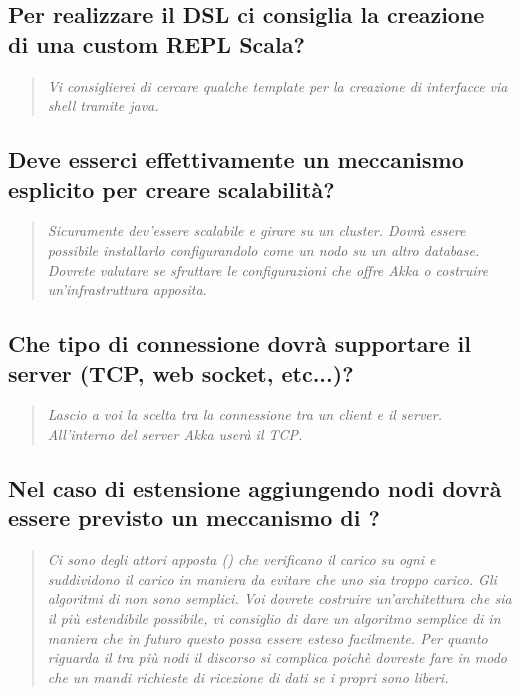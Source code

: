 \documentclass{scalatekids-article}
\begin{document}
\subsection{Per realizzare il DSL ci consiglia la creazione di una custom REPL Scala?}
\begin{quote}
  \textit{Vi consiglierei di cercare qualche template per la creazione di interfacce via shell tramite java.\\}
\end{quote}
\subsection{Deve esserci effettivamente un meccanismo esplicito per creare scalabilità?}
\begin{quote}
  \textit{Sicuramente dev'essere scalabile e girare su un cluster. Dovrà essere possibile installarlo configurandolo come un nodo su un altro database. Dovrete valutare se sfruttare le configurazioni che 
  offre Akka o costruire un'infrastruttura apposita.\\}
\end{quote}
\subsection{Che tipo di connessione dovrà supportare il server (TCP, web socket, etc...)?}
\begin{quote}
  \textit{Lascio a voi la scelta tra la connessione tra un client e il server. All'interno del server Akka userà il TCP.\\}
\end{quote}
\subsection{Nel caso di estensione aggiungendo nodi dovrà essere previsto un meccanismo di ?}
\begin{quote}
  \textit{Ci sono degli attori apposta () che verificano il carico su ogni  e suddividono il carico in maniera da evitare che uno  sia troppo carico. 
  Gli algoritmi di  non sono semplici. Voi dovrete costruire un'architettura che sia il più estendibile possibile, vi consiglio di dare un algoritmo semplice di  in maniera che in futuro questo possa essere esteso facilmente. Per quanto riguarda il  tra più nodi il discorso si complica poichè dovreste fare in modo che un  mandi richieste di ricezione di dati se i propri  sono liberi.\\}
\end{quote}
\end{document}

